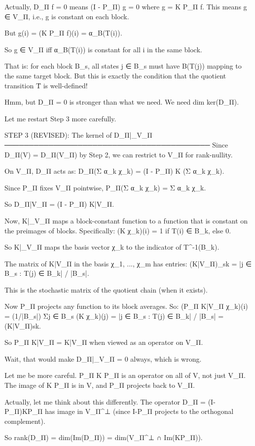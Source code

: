 Actually, D_Π f = 0 means (I - P_Π) g = 0 where g = K P_Π f.
This means g ∈ V_Π, i.e., g is constant on each block.

But g(i) = (K P_Π f)(i) = α_{B(T(i))}.

So g ∈ V_Π iff α_{B(T(i))} is constant for all i in the same block.

That is: for each block B_s, all states j ∈ B_s must have B(T(j)) mapping
to the same target block. But this is exactly the condition that the
quotient transition T̄ is well-defined!

Hmm, but D_Π = 0 is stronger than what we need. We need dim ker(D_Π).

Let me restart Step 3 more carefully.

STEP 3 (REVISED): The kernel of D_Π|_{V_Π}
──────────────────────────────────────────
Since D_Π(V) = D_Π(V_Π) by Step 2, we can restrict to V_Π for rank-nullity.

On V_Π, D_Π acts as:
D_Π(Σ α_k χ_k) = (I - P_Π) K (Σ α_k χ_k).

Since P_Π fixes V_Π pointwise, P_Π(Σ α_k χ_k) = Σ α_k χ_k.

So D_Π|{V_Π} = (I - P_Π) K|{V_Π}.

Now, K|_{V_Π} maps a block-constant function to a function that is
constant on the preimages of blocks. Specifically:
(K χ_k)(i) = 1 if T(i) ∈ B_k, else 0.

So K|_{V_Π} maps the basis vector χ_k to the indicator of T^{-1}(B_k).

The matrix of K|{V_Π} in the basis {χ_1, ..., χ_m} has entries:
(K|{V_Π})_{sk} = |{j ∈ B_s : T(j) ∈ B_k}| / |B_s|.

This is the stochastic matrix of the quotient chain (when it exists).

Now P_Π projects any function to its block averages. So:
(P_Π K|{V_Π} χ_k)(i) = (1/|B_s|) Σ{j ∈ B_s} (K χ_k)(j)
= |{j ∈ B_s : T(j) ∈ B_k}| / |B_s|
= (K|{V_Π}){sk}.

So P_Π K|{V_Π} = K|{V_Π} when viewed as an operator on V_Π.

Wait, that would make D_Π|_{V_Π} = 0 always, which is wrong.

Let me be more careful. P_Π K P_Π is an operator on all of V, not just V_Π.
The image of K P_Π is in V, and P_Π projects back to V_Π.

Actually, let me think about this differently. The operator D_Π = (I-P_Π)KP_Π
has image in V_Π^⊥ (since I-P_Π projects to the orthogonal complement).

So rank(D_Π) = dim(Im(D_Π)) = dim(V_Π^⊥ ∩ Im(KP_Π)).

